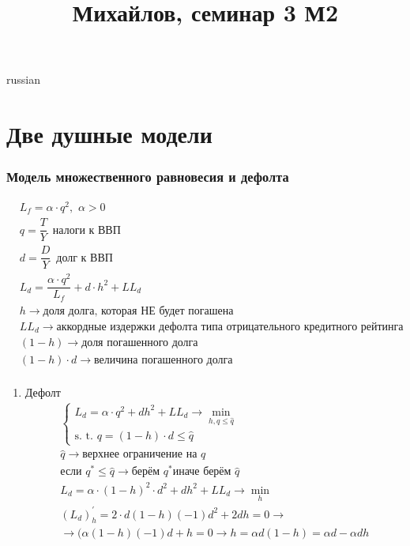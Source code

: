 \documentclass{article}
\begin{document}
\title{\foreignlanguage{russian}{Михайлов, семинар 3 М2}}
\maketitle
\begin{otherlanguage*}{russian}
\section*{Две душные модели}
\subsubsection*{Модель множественного равновесия и дефолта}
\begin{align*}
& L_f = \alpha \cdot q^2, \,\, \alpha > 0 \\
& q = \dfrac{T}{Y} \,\,\, \text{налоги к ВВП}  \\
& d = \dfrac{D}{Y} \,\,\, \text{долг к ВВП} \\
& L_d = \dfrac{\alpha  \cdot q^2 }{L_f} + d \cdot h ^ 2 + LL_d \\
& h \rightarrow \text{доля долга, которая НЕ будет погашена} \\
& LL_d \rightarrow \text{аккордные издержки дефолта типа отрицательного кредитного рейтинга} \\
& (1 - h) \rightarrow \text{доля погашенного долга} \\ 
& (1 - h) \cdot d \rightarrow \text{величина погашенного долга} \\
\end{align*}
\begin{enumerate}
\item Дефолт
\begin{align*}
\begin{cases}
L_d = \alpha \cdot q ^2 + d h^2 + LL_d \rightarrow \min_{h, q \le \hat q} \\
\text{s. t.  } q = (1 - h) \cdot d \le \hat q 
\end{cases} \\
\hat q \rightarrow	\text{верхнее ограничение на }  q \\
\text{если } q^* \le \hat q \rightarrow \text{берём } q^* 
\text{иначе берём } \hat q \\
L_d = \alpha \cdot (1 - h) ^ 2 \cdot d ^2 + d h^2 + LL_d \rightarrow \min_h \\
(L_d)^{'}_h = 2 \cdot d (1 - h) (-1 ) d ^2 + 2 d h = 0 \rightarrow \\
\rightarrow ( \alpha (1 - h) (-1) d + h = 0 \rightarrow h = \alpha d (1 - h) = \alpha d - \alpha d h \\

\end{align*}
\end{enumerate}
\end{otherlanguage*}
\end{document}
